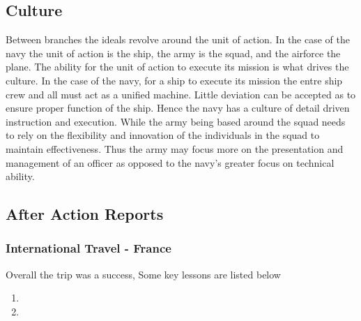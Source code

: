 \subsection{Culture}
Between branches the ideals revolve around the unit of action. In the case of the navy the unit of action is the ship, the army is the squad, and the airforce the plane. The ability for the unit of action to execute its mission is what drives the culture. In the case of the navy, for a ship to execute its mission the entre ship crew and all must act as a unified machine. Little deviation can be accepted as to ensure proper function of the ship. Hence the navy has a culture of detail driven instruction and execution. While the army being based around the squad needs to rely on the flexibility and innovation of the individuals in the squad to maintain effectiveness. Thus the army may focus more on the presentation and management of an officer as opposed to the navy's greater focus on technical ability. 



\subsection{After Action Reports}
\subsubsection{International Travel - France}
Overall the trip was a success, Some key lessons are listed below
\begin{enumerate}
    \item 
    \item 
\end{enumerate}